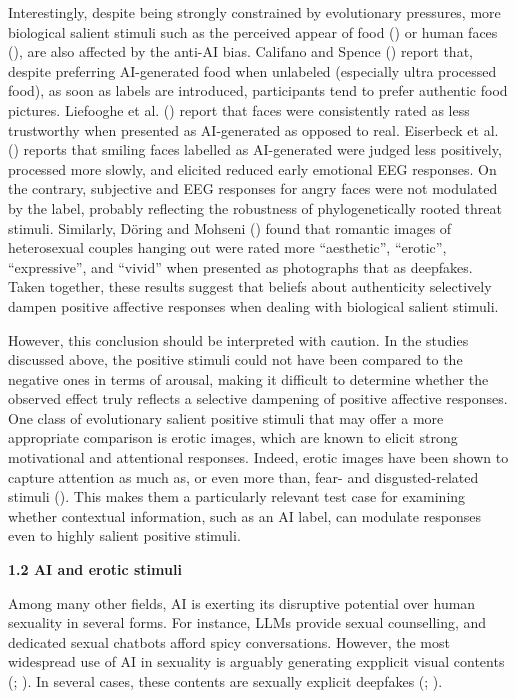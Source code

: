 \documentclass[
  jou,
  floatsintext,
  longtable,
  nolmodern,
  notxfonts,
  notimes,
  colorlinks=true,linkcolor=blue,citecolor=blue,urlcolor=blue]{apa7}
\begin{document}
Interestingly, despite being strongly constrained by evolutionary
pressures, more biological salient stimuli such as the perceived appear
of food ()
or human faces (), are also affected by the anti-AI bias. Califano and Spence
() report that, despite
preferring AI-generated food when unlabeled (especially ultra processed
food), as soon as labels are introduced, participants tend to prefer
authentic food pictures. Liefooghe et al.
() report that faces were
consistently rated as less trustworthy when presented as AI-generated as
opposed to real. Eiserbeck et al.
() reports that smiling faces
labelled as AI-generated were judged less positively, processed more
slowly, and elicited reduced early emotional EEG responses. On the
contrary, subjective and EEG responses for angry faces were not
modulated by the label, probably reflecting the robustness of
phylogenetically rooted threat stimuli. Similarly, Döring and Mohseni
() found that romantic images of
heterosexual couples hanging out were rated more ``aesthetic'',
``erotic'', ``expressive'', and ``vivid'' when presented as photographs
that as deepfakes. Taken together, these results suggest that beliefs
about authenticity selectively dampen positive affective responses when
dealing with biological salient stimuli.

However, this conclusion should be interpreted with caution. In the
studies discussed above, the positive stimuli could not have been
compared to the negative ones in terms of arousal, making it difficult
to determine whether the observed effect truly reflects a selective
dampening of positive affective responses. One class of evolutionary
salient positive stimuli that may offer a more appropriate comparison is
erotic images, which are known to elicit strong motivational and
attentional responses. Indeed, erotic images have been shown to capture
attention as much as, or even more than, fear- and disgusted-related
stimuli ().
This makes them a particularly relevant test case for examining whether
contextual information, such as an AI label, can modulate responses even
to highly salient positive stimuli.

\textbf{1.2 AI and erotic stimuli}

Among many other fields, AI is exerting its disruptive potential over
human sexuality in several forms. For instance, LLMs provide sexual
counselling, and dedicated sexual chatbots afford spicy conversations.
However, the most widespread use of AI in sexuality is arguably
generating expplicit visual contents
(;
). In several
cases, these contents are sexually explicit deepfakes
(;
).
\end{document}
